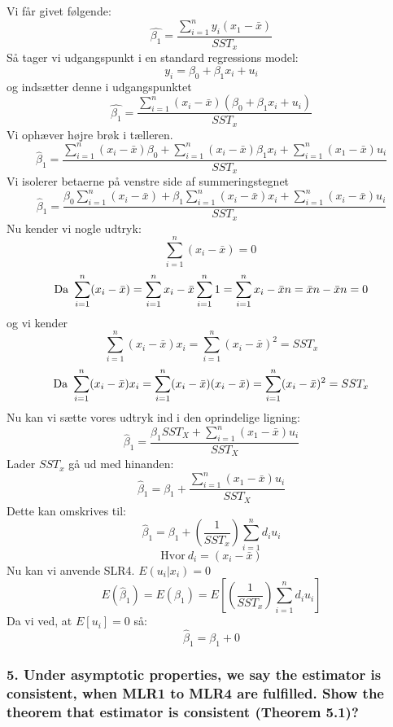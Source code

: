 \documentclass[
  10pt,
]{article}
\begin{document}
Vi får givet følgende:
\[ \hat{\beta_1}=\frac{\sum\limits_{i=1}^n y_i(x_1-\bar{x})}{SST_x}\] Så
tager vi udgangspunkt i en standard regressions model:
\[y_i=\beta_0+\beta_1x_i+u_i \] og indsætter denne i udgangspunktet
\[ \hat{\beta_1}=\frac{\sum\limits_{i=1}^n (x_i-\bar{x})(\beta_0+\beta_1x_i+u_i)}{SST_x} \]
Vi ophæver højre brøk i tælleren.
\[ \hat\beta_1 =\frac{\sum\limits_{i=1}^n (x_i-\bar{x})\beta_0 +\sum\limits_{i=1}^n (x_i-\bar{x})\beta_1x_i+\sum\limits_{i=1}^n (x_1-\bar{x})u_i} {SST_x} \]
Vi isolerer betaerne på venstre side af summeringstegnet
\[ \hat\beta_1 =\frac{\beta_0\sum\limits_{i=1}^n (x_i-\bar{x}) +\beta_1\sum\limits_{i=1}^n (x_i-\bar{x})x_i+\sum\limits_{i=1}^n (x_i-\bar{x})u_i} {SST_x} \]
Nu kender vi nogle udtryk: \[\sum\limits_{i=1}^n (x_i-\bar{x})=0\ \]
\[\text{Da}\\\ \sum\limits_{i=1}^n (x_i-\bar{x}) = \sum\limits_{i=1}^n x_i-\bar{x} \sum\limits_{i=1}^n 1=\sum\limits_{i=1}^n x_i-\bar{x}n= \bar{x}n-\bar{x}n=0 \]
og vi kender
\[\sum\limits_{i=1}^n (x_i-\bar{x})x_i=\sum\limits_{i=1}^n (x_i-\bar{x})^2=SST_x \]
\[\text{Da} \\\
\sum\limits_{i=1}^n (x_i-\bar{x})x_i = \sum\limits_{i=1}^n (x_i-\bar{x})(x_i-\bar{x})=\sum\limits_{i=1}^n (x_i-\bar{x})^2=SST_x \]
Nu kan vi sætte vores udtryk ind i den oprindelige ligning:
\[\hat\beta_1 =\frac{\beta_1 SST_X+\sum\limits_{i=1}^n (x_1-\bar{x})u_i}{SST_X} \]
Lader \(SST_x\) gå ud med hinanden:
\[\hat\beta_1 =\beta_1+\frac{ \sum\limits_{i=1}^n (x_1-\bar{x})u_i}{SST_X} \]
Dette kan omskrives til:
\[\hat\beta_1=\beta_1+\left(\frac{1}{SST_x}\right)\sum\limits_{i=1}^nd_iu_i \]
\[ \text{Hvor}\ d_i =(x_i-\bar{x})\] Nu kan vi anvende SLR4.
\(E(u_i|x_i)=0\)
\[ E(\hat\beta_1)=E(\beta_1)=E\left[(\frac{1}{SST_x})\sum\limits_{i=1}^nd_iu_i\right]\]
Da vi ved, at \(E[u_i]=0\) så: \[\hat\beta_1=\beta_1+0\] \newpage

\hypertarget{under-asymptotic-properties-we-say-the-estimator-is-consistent-when-mlr1-to-mlr4-are-fulfilled.-show-the-theorem-that-estimator-is-consistent-theorem-5.1}{%
\subsubsection{5. Under asymptotic properties, we say the estimator is
consistent, when MLR1 to MLR4 are fulfilled. Show the theorem that
estimator is consistent (Theorem
5.1)?}\label{under-asymptotic-properties-we-say-the-estimator-is-consistent-when-mlr1-to-mlr4-are-fulfilled.-show-the-theorem-that-estimator-is-consistent-theorem-5.1}}
\end{document}
